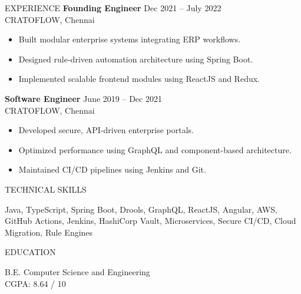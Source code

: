 \documentclass{resume}
\begin{document}
\begin{rSection}{EXPERIENCE}
\textbf{Founding Engineer} \hfill Dec 2021 – July 2022 \\
CRATOFLOW, Chennai
\begin{itemize}
\itemsep -3pt {}
\item Built modular enterprise systems integrating ERP workflows.
\item Designed rule-driven automation architecture using Spring Boot.
\item Implemented scalable frontend modules using ReactJS and Redux.
\end{itemize}

\textbf{Software Engineer} \hfill June 2019 – Dec 2021 \\
CRATOFLOW, Chennai
\begin{itemize}
\itemsep -3pt {}
\item Developed secure, API-driven enterprise portals.
\item Optimized performance using GraphQL and component-based architecture.
\item Maintained CI/CD pipelines using Jenkins and Git.
\end{itemize}

\end{rSection}

\begin{rSection}{TECHNICAL SKILLS}

Java, TypeScript, Spring Boot, Drools, GraphQL, ReactJS, Angular, AWS, GitHub Actions, Jenkins, HashiCorp Vault, Microservices, Secure CI/CD, Cloud Migration, Rule Engines

\end{rSection}

\begin{rSection}{EDUCATION}

B.E. Computer Science and Engineering \\
CGPA: 8.64 / 10

\end{rSection}
\end{document}
